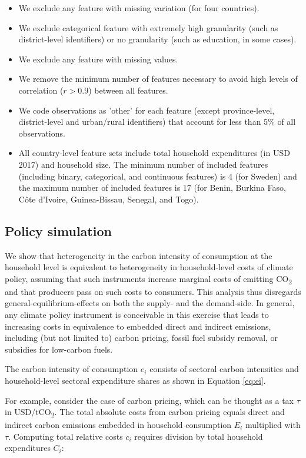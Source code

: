 \documentclass[12pt, a4paper]{article}
\begin{document}
\begin{refsection}
\begin{itemize}
    \item We exclude any feature with missing variation (for four countries).
    \item We exclude categorical feature with extremely high granularity (such as district-level identifiers) or no granularity (such as education, in some cases).
    \item We exclude any feature with missing values.
    \item We remove the minimum number of features necessary to avoid high levels of correlation ($r>0.9$) between all features.
    \item We code observations as 'other' for each feature (except province-level, district-level and urban/rural identifiers) that account for less than 5\% of all observations.
    \item All country-level feature sets include total household expenditures (in USD 2017) and household size. The minimum number of included features (including binary, categorical, and continuous features) is 4 (for Sweden) and the maximum number of included features is 17 (for Benin, Burkina Faso, Côte d'Ivoire, Guinea-Bissau, Senegal, and Togo).
\end{itemize}

\subsection{Policy simulation}\label{sec:policysimulation}

We show that heterogeneity in the carbon intensity of consumption at the household level is equivalent to heterogeneity in household-level costs of climate policy, assuming that such instruments increase marginal costs of emitting CO\textsubscript{2} and that producers pass on such costs to consumers. This analysis thus disregards general-equilibrium-effects on both the supply- and the demand-side. In general, any climate policy instrument is conceivable in this exercise that leads to increasing costs in equivalence to embedded direct and indirect emissions, including (but not limited to) carbon pricing, fossil fuel subsidy removal, or subsidies for low-carbon fuels.

The carbon intensity of consumption $e_{i}$ consists of sectoral carbon intensities and household-level sectoral expenditure shares as shown in Equation \ref{eq:ei}. 

For example, consider the case of carbon pricing, which can be thought as a tax $\tau$ in USD/tCO\textsubscript{2}. The total absolute costs from carbon pricing equals direct and indirect carbon emissions embedded in household consumption $E_{i}$ multiplied with $\tau$. Computing total relative costs $c_{i}$ requires division by total household expenditures $C_{i}$:


\end{refsection}
\end{document}

